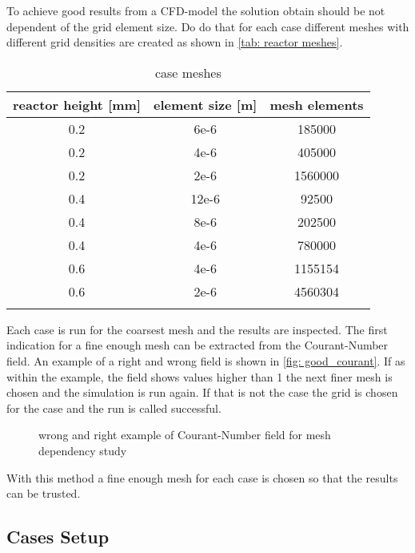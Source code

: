 \documentclass[../thesis.tex]{subfiles}
\begin{document}
To achieve good results from a CFD-model the solution obtain should be not dependent of the grid element size. 
Do do that for each case different meshes with different grid densities are created as shown in \autoref{tab: reactor meshes}.
\begin{table} [htb]
	\centering
	\caption{case meshes}
	\begin{tabular}{ ccc }
		\hline
		reactor height [mm] & element size [m] & mesh elements \\
		\hline
		0.2 & 6e-6 & 185000\\
		0.2 & 4e-6 & 405000\\
		0.2 & 2e-6 & 1560000\\
		0.4 & 12e-6 & 92500\\
		0.4 & 8e-6 & 202500\\
		0.4 & 4e-6 & 780000\\
		0.6 & 4e-6 & 1155154\\
		0.6 & 2e-6 & 4560304\\
		\hline		
		\label{tab: reactor meshes}
	\end{tabular}
\end{table}
Each case is run for the coarsest mesh and the results are inspected. The first indication for a fine enough mesh can be extracted from the Courant-Number field. An example of a right and wrong field is shown in \autoref{fig: good_courant}. If as within the example, the field shows values higher than 1 the next finer mesh is chosen and the simulation is run again. If that is not the case the grid is chosen for the case and the run is called successful.

\begin{figure}[htb]
	\centering
	\qquad
	\caption{wrong and right example of Courant-Number field for mesh dependency study}
	\label{fig: good_courant}
\end{figure}
With this method a fine enough mesh for each case is chosen so that the results can be trusted.

\subsection{Cases Setup}
\end{document}
